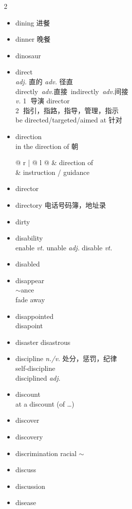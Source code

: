 \documentclass[../../book.tex]{subfiles}
\begin{document}
\begin{multicols}{2}
\begin{itemize}
\item[-] dining 进餐
\item[-] dinner 晚餐
\item[-] dinosaur
\item[-] direct
\\\emph{adj.} 直的 \emph{adv.} 径直
\\\mbox{directly \emph{adv.}直接 indirectly \emph{adv.}间接}
\\\emph{v.} \textcircled{1} 导演 director
\\\textcircled{2} 指引，指路，指导，管理，指示
\\be directed/targeted/aimed at 针对
\item[-] direction
\\in the direction of 朝
\\\begin{tabular}{@{} r | @{\hspace{0.1em}} l @{}}
 & direction of
\\& instruction / guidance
\end{tabular}
\item[-] director
\item[-] directory 电话号码簿，地址录
\item[-] dirty
\item[-] disability
\\enable \emph{vt.} \phantom{a} unable \emph{adj.} \phantom{a} disable \emph{vt.}
\item[-] disabled
\item[-] disappear
\\$\sim$ance
\\fade away
\item[-] disappointed
\\disapoint
\item[-] disaster \phantom{a} disastrous
\item[-] discipline \emph{n./v.} 处分，惩罚，纪律
\\self-discipline
\\disciplined \emph{adj.}
\item[-] discount
\\at a discount (of \ldots)
\item[-] discover
\item[-] discovery
\item[-] discrimination \phantom{a} racial $\sim$
\item[-] discuss
\item[-] discussion
\item[-] disease

\end{itemize}
\end{multicols}
\end{document}
